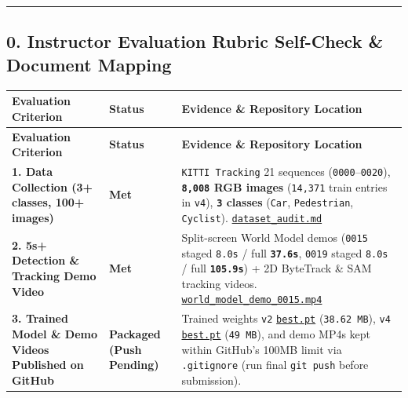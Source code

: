 \documentclass[10.5pt,a4paper]{article}
\begin{document}
\par\noindent\rule{\textwidth}{0.4pt}\par\medskip

\subsection{0. Instructor Evaluation Rubric Self-Check \& Document Mapping}


\begin{footnotesize}
\setlength{\tabcolsep}{4pt}
\setlength{\LTleft}{0pt}\setlength{\LTright}{0pt}
\begin{longtable}{>{\raggedright\arraybackslash}p{} >{\raggedright\arraybackslash}p{} >{\raggedright\arraybackslash}p{}}
\toprule
\textbf{Evaluation Criterion} & \textbf{Status} & \textbf{Evidence \& Repository Location} \\
\midrule
\endfirsthead
\toprule
\textbf{Evaluation Criterion} & \textbf{Status} & \textbf{Evidence \& Repository Location} \\
\midrule
\endhead
\bottomrule
\endfoot
\textbf{1. Data Collection (3+ classes, 100+ images)} & \textbf{Met} & \texttt{KITTI Tracking} 21 sequences (\texttt{0000}--\texttt{0020}), \textbf{\texttt{8,\allowbreak{}008} RGB images} (\texttt{14,\allowbreak{}371} train entries in \texttt{v4}), \textbf{\texttt{3} classes} (\texttt{Car}, \texttt{Pedestrian}, \texttt{Cyclist}). \href{https://github.com/Heisnotanimposter/Totalcare\_autonomous\_driving\_Yolov5/blob/main/dataset\_audit.md}{\texttt{dataset\_\allowbreak{}audit.\allowbreak{}md}} \\
\textbf{2. 5s+ Detection \& Tracking Demo Video} & \textbf{Met} & Split-screen World Model demos (\texttt{0015} staged \texttt{8.\allowbreak{}0s} / full \textbf{\texttt{37.\allowbreak{}6s}}, \texttt{0019} staged \texttt{8.\allowbreak{}0s} / full \textbf{\texttt{105.\allowbreak{}9s}}) + 2D ByteTrack \& SAM tracking videos. \href{https://github.com/Heisnotanimposter/Totalcare\_autonomous\_driving\_Yolov5/blob/main/results/v4\_road\_lane/world\_outputs/v4\_world\_outputs/world\_model\_0015\_full/world\_model\_demo\_0015.mp4}{\texttt{world\_\allowbreak{}model\_\allowbreak{}demo\_\allowbreak{}0015.\allowbreak{}mp4}} \\
\textbf{3. Trained Model \& Demo Videos Published on GitHub} & \textbf{Packaged (Push Pending)} & Trained weights \texttt{v2} \href{https://github.com/Heisnotanimposter/Totalcare\_autonomous\_driving\_Yolov5/blob/main/results/v2\_improved/outputs/weights/best.pt}{\texttt{best.\allowbreak{}pt}} (\texttt{38.\allowbreak{}62 MB}), \texttt{v4} \href{https://github.com/Heisnotanimposter/Totalcare\_autonomous\_driving\_Yolov5/blob/main/results/v4\_road\_lane/detect\_outputs/outputs/weights/best.pt}{\texttt{best.\allowbreak{}pt}} (\texttt{49 MB}), and demo MP4s kept within GitHub's 100MB limit via \texttt{.\allowbreak{}gitignore} (run final \texttt{git push} before submission). \\

\end{longtable}
\end{footnotesize}
\end{document}
